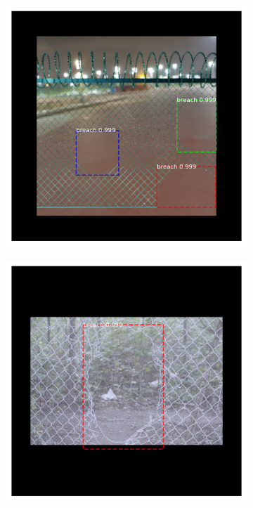 \documentclass[../Head/Main.tex]{subfiles}
\begin{document}
\begin{figure}[H]
\begin{subfigure}{.24\textwidth}
        \caption{}
    \end{subfigure}
    \hfill
    \begin{subfigure}{.24\textwidth}
        \centering
        \includegraphics[width=\textwidth]{../Figures/rcnn_results/found_breaches/good_performance/10.png}
        \caption{}
    \end{subfigure}
    \hfill
    \begin{subfigure}{.24\textwidth}
        \centering
        \includegraphics[width=\textwidth]{../Figures/rcnn_results/found_breaches/good_performance/8.png}

\end{subfigure}
\end{figure}
\end{document}
